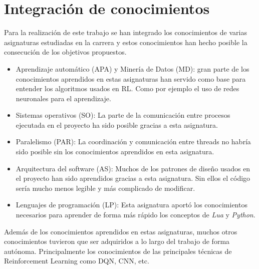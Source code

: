 \section{Integración de conocimientos}

Para la realización de este trabajo se han integrado los conocimientos de varias asignaturas estudiadas en la carrera y estos conocimientos han hecho posible la consecución de los objetivos propuestos.

\begin{itemize}
    \item Aprendizaje automático (APA) y Minería de Datos (MD): gran parte de los conocimientos aprendidos en estas asignaturas han servido como base para entender los algoritmos usados en RL. Como por ejemplo el uso de redes neuronales para el aprendizaje.
    \item Sistemas operativos (SO): La parte de la comunicación entre procesos ejecutada en el proyecto ha sido posible gracias a esta asignatura.
    \item Paralelismo (PAR): La coordinación y comunicación entre threads no habría sido posible sin los conocimientos aprendidos en esta asignatura.
    \item Arquitectura del software (AS): Muchos de los patrones de diseño usados en el proyecto han sido aprendidos gracias a esta asignatura. Sin ellos el código sería mucho menos legible y más complicado de modificar.
    \item Lenguajes de programación (LP): Esta asignatura aportó los conocimientos necesarios para aprender de forma más rápido los conceptos de \textit{Lua} y \textit{Python}.
\end{itemize}

Además de los conocimientos aprendidos en estas asignaturas, muchos otros conocimientos tuvieron que ser adquiridos a lo largo del trabajo de forma autónoma. Principalmente los conocimientos de las principales técnicas de Reinforcement Learning como DQN, CNN, etc.

